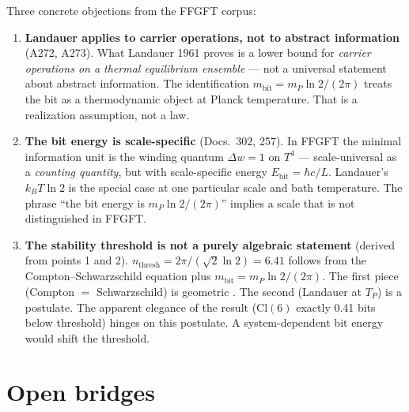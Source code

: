 Three concrete objections from the FFGFT corpus:

\begin{enumerate}

\item \textbf{Landauer applies to carrier operations, not to abstract
  information} (A272, A273).
  What Landauer 1961 proves is a lower bound for \emph{carrier
  operations on a thermal equilibrium ensemble} — not a universal
  statement about abstract information.
  The identification $m_{\mathrm{bit}} = m_P\ln 2/(2\pi)$ treats the
  bit as a thermodynamic object at Planck temperature.
  That is a realization assumption, not a law.

\item \textbf{The bit energy is scale-specific} (Docs.\ 302, 257).
  In FFGFT the minimal information unit is the winding quantum
  $\Delta w = 1$ on $T^4$ — scale-universal as a \emph{counting
  quantity}, but with scale-specific energy
  $E_{\mathrm{bit}} = \hbar c/L$.
  Landauer's $k_BT\ln 2$ is the special case at one particular scale
  and bath temperature. The phrase \enquote{the bit energy is
  $m_P\ln 2/(2\pi)$} implies a scale that is not distinguished in FFGFT.

\item \textbf{The stability threshold is not a purely algebraic
  statement} (derived from points 1 and 2).
  $n_{\mathrm{thresh}} = 2\pi/(\sqrt{2}\ln 2) = 6.41$ follows from the
  Compton--Schwarzschild equation plus
  $m_{\mathrm{bit}} = m_P\ln 2/(2\pi)$.
  The first piece (Compton $=$ Schwarzschild) is geometric \B.
  The second (Landauer at $T_P$) is a postulate.
  The apparent elegance of the result ($\mathrm{Cl}(6)$ exactly 0.41
  bits below threshold) hinges on this postulate.
  A system-dependent bit energy would shift the threshold.

\end{enumerate}

\section{Open bridges}

